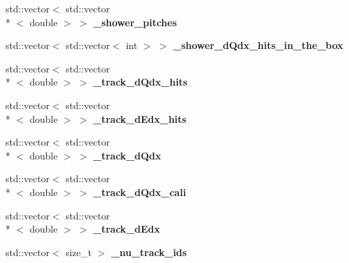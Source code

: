 \begin{DoxyCompactItemize}
\item 
\hypertarget{group__lee_gaf56713e8dd07060973767857b7f8508f}{std\-::vector$<$ std\-::vector\\*
$<$ double $>$ $>$ {\bfseries \-\_\-shower\-\_\-pitches}}\label{group__lee_gaf56713e8dd07060973767857b7f8508f}

\item 
\hypertarget{group__lee_ga99371e105e8aa387ee0f0b548f788b57}{std\-::vector$<$ std\-::vector$<$ int $>$ $>$ {\bfseries \-\_\-shower\-\_\-d\-Qdx\-\_\-hits\-\_\-in\-\_\-the\-\_\-box}}\label{group__lee_ga99371e105e8aa387ee0f0b548f788b57}

\item 
\hypertarget{group__lee_ga4aa643d1912fe002773cb2bd1268f0f8}{std\-::vector$<$ std\-::vector\\*
$<$ double $>$ $>$ {\bfseries \-\_\-track\-\_\-d\-Qdx\-\_\-hits}}\label{group__lee_ga4aa643d1912fe002773cb2bd1268f0f8}

\item 
\hypertarget{group__lee_ga3ad01e55fc294c33fcff222f0efa2a1a}{std\-::vector$<$ std\-::vector\\*
$<$ double $>$ $>$ {\bfseries \-\_\-track\-\_\-d\-Edx\-\_\-hits}}\label{group__lee_ga3ad01e55fc294c33fcff222f0efa2a1a}

\item 
\hypertarget{group__lee_gab54b1be84b3a383b57e5b1c76b480d6b}{std\-::vector$<$ std\-::vector\\*
$<$ double $>$ $>$ {\bfseries \-\_\-track\-\_\-d\-Qdx}}\label{group__lee_gab54b1be84b3a383b57e5b1c76b480d6b}

\item 
\hypertarget{group__lee_gadcd255a2c652d64e4694c6b650839f43}{std\-::vector$<$ std\-::vector\\*
$<$ double $>$ $>$ {\bfseries \-\_\-track\-\_\-d\-Qdx\-\_\-cali}}\label{group__lee_gadcd255a2c652d64e4694c6b650839f43}

\item 
\hypertarget{group__lee_ga81034997677b254a8fa7fb9c090fa756}{std\-::vector$<$ std\-::vector\\*
$<$ double $>$ $>$ {\bfseries \-\_\-track\-\_\-d\-Edx}}\label{group__lee_ga81034997677b254a8fa7fb9c090fa756}

\item 
\hypertarget{group__lee_ga5253913419cf4211211558082106bd62}{std\-::vector$<$ size\-\_\-t $>$ {\bfseries \-\_\-nu\-\_\-track\-\_\-ids}}\label{group__lee_ga5253913419cf4211211558082106bd62}


\end{DoxyCompactItemize}
